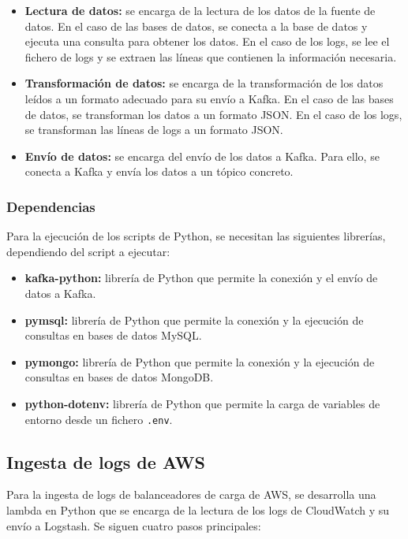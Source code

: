\begin{itemize}
	\item \textbf{Lectura de datos:} se encarga de la lectura de los datos de
		la fuente de datos. En el caso de las bases de datos, se conecta a la
		base de datos y ejecuta una consulta para obtener los datos. En el caso
		de los logs, se lee el fichero de logs y se extraen las líneas que
		contienen la información necesaria.
	\item \textbf{Transformación de datos:} se encarga de la transformación de
		los datos leídos a un formato adecuado para su envío a Kafka. En el caso
		de las bases de datos, se transforman los datos a un formato JSON. En el
		caso de los logs, se transforman las líneas de logs a un formato JSON.
	\item \textbf{Envío de datos:} se encarga del envío de los datos a Kafka.
		Para ello, se conecta a Kafka y envía los datos a un tópico concreto.
\end{itemize}


\subsubsection{Dependencias}
Para la ejecución de los scripts de Python, se necesitan las siguientes
librerías, dependiendo del script a ejecutar:

\begin{itemize}
	\item \textbf{kafka-python:} librería de Python que permite la conexión y
		el envío de datos a Kafka.
	\item \textbf{pymsql:} librería de Python que permite la conexión y la
		ejecución de consultas en bases de datos MySQL.
	\item \textbf{pymongo:} librería de Python que permite la conexión y la
		ejecución de consultas en bases de datos MongoDB.
	\item \textbf{python-dotenv:} librería de Python que permite la carga de
		variables de entorno desde un fichero \texttt{.env}.
\end{itemize}


\newpage{}
\subsection{Ingesta de logs de AWS}\label{subsec:impl_ingesta_aws}
Para la ingesta de logs de balanceadores de carga de AWS, se desarrolla una
lambda en Python que se encarga de la lectura de los logs de CloudWatch y su
envío a Logstash. Se siguen cuatro pasos principales:

